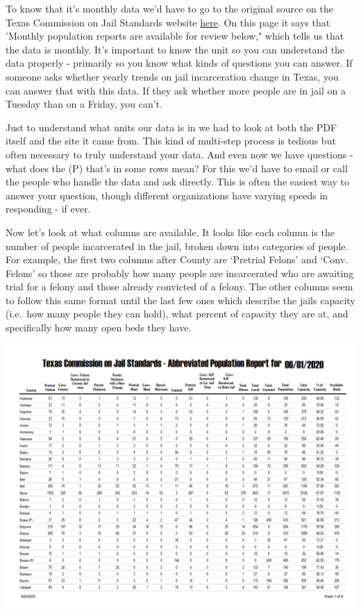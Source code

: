 \documentclass[
  12pt,
]{book}
\begin{document}
To know that it's monthly data we'd have to go to the original source on the Texas Commission on Jail Standards website \href{https://www.tcjs.state.tx.us/historical-population-reports/\#1580454195676-420daca6-0a306}{here}. On this page it says that 'Monthly population reports are available for review below," which tells us that the data is monthly. It's important to know the unit so you can understand the data properly - primarily so you know what kinds of questions you can answer. If someone asks whether yearly trends on jail incarceration change in Texas, you can answer that with this data. If they ask whether more people are in jail on a Tuesday than on a Friday, you can't.

Just to understand what units our data is in we had to look at both the PDF itself and the site it came from. This kind of multi-step process is tedious but often necessary to truly understand your data. And even now we have questions - what does the (P) that's in some rows mean? For this we'd have to email or call the people who handle the data and ask directly. This is often the easiest way to answer your question, though different organizations have varying speeds in responding - if ever.

Now let's look at what columns are available. It looks like each column is the number of people incarcerated in the jail, broken down into categories of people. For example, the first two columns after County are `Pretrial Felons' and `Conv. Felons' so those are probably how many people are incarcerated who are awaiting trial for a felony and those already convicted of a felony. The other columns seem to follow this same format until the last few ones which describe the jails capacity (i.e.~how many people they can hold), what percent of capacity they are at, and specifically how many open beds they have.

\includegraphics{images/tabulizer1.PNG}
\end{document}
